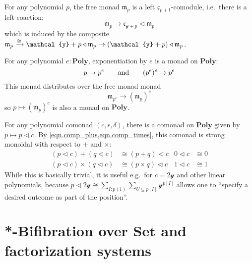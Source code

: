 \documentclass[11pt, one side, article]{memoir}
\theoremstyle{definition}
\theoremstyle{plain}
\renewcommand{\ss}{\subseteq}
\newcommand{\Cat}[1]{\mathbf{#1}}%
\newcommand{\To}[2][]{\xrightarrow[#1]{\tn{$#2$}}}
\newcommand{\tn}[1]{\textnormal{#1}}
\newcommand{\smset}{\Cat{Set}}
\newcommand{\yon}{{\mathcal{y}}}
\newcommand{\poly}{\Cat{Poly}}
\newcommand{\0}{\textsf{0}}
\newcommand{\1}{\tn{\textsf{1}}}
\newcommand{\tri}{\mathbin{\triangleleft}}
\newcommand{\cofree}{\mathfrak{c}}
\newcommand{\free}{\mathfrak{m}}
\newcommand{\hh}[2][]{#1 \tn{#2} #1}
\newcommand{\qqand}{\hh[\qquad]{and}}
\begin{document}
For any polynomial $p$, the free monad $\free_p$ is a left $\cofree_{p+1}$-comodule, i.e.\ there is a left coaction:
\begin{equation}
	\free_p\to\cofree_{\yon+p}\tri\free_p
\end{equation}
which is induced by the composite $\free_p\To{\cong}\yon+p\tri\free_p\to(\yon+p)\tri\free_p$. 

For any polynomial $e:\poly$, exponentiation by $e$ is a monad on $\poly$:
\begin{equation}
	p\to p^e
	\qqand
	(p^e)^e\to p^e
\end{equation}
This monad distributes over the free monad monad
\begin{equation}
	\free_{p^e}\to(\free_p)^e
\end{equation}
so $p\mapsto(\free_p)^e$ is also a monad on $\poly$.

For any polynomial comonad $(c,\epsilon,\delta)$, there is a comonad on $\poly$ given by $p\mapsto p\tri c$. By \cref{eqn.comp_plus,eqn.comp_times}, this comonad is strong monoidal with respect to $+$ and $\times$:
\begin{align}
	(p\tri c)+(q\tri c)&\cong (p+q)\tri c&0\tri c&\cong0\\
	(p\tri c)\times(q\tri c)&\cong (p\times q)\tri c&1\tri c&\cong1	
\end{align}
While this is basically trivial, it is useful e.g.\ for $c=2\yon$ and other linear polynomials, because $p\tri 2\yon\cong\sum_{I:p(1)}\sum_{U\ss p[I]}\yon^{p[I]}$ allows one to ``specify a desired outcome as part of the position''.

\chapter{*-Bifibration over $\smset$ and factorization systems}\label{chap.bifib}
\end{document}

